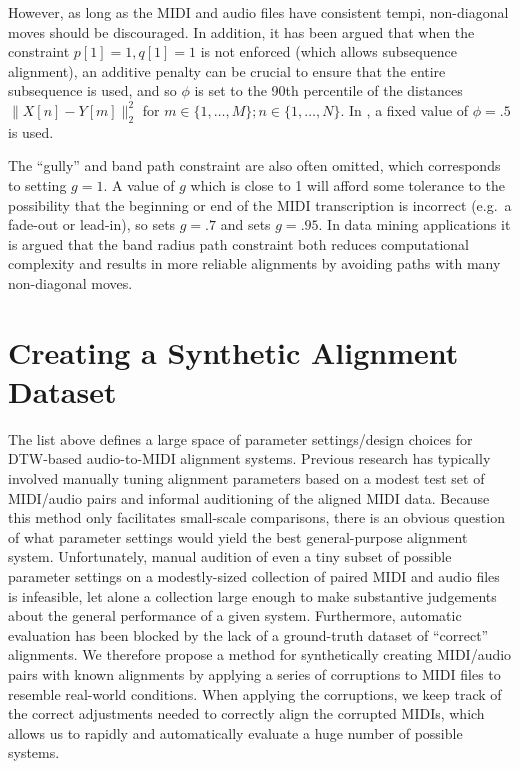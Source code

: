 \documentclass{article}
\begin{document}
\begin{description}[topsep=1pt,itemsep=-1pt,leftmargin=5pt]
However, as long as the MIDI and audio files have consistent tempi, non-diagonal moves should be discouraged.
In addition, it has been argued \cite{raffel2015large} that when the constraint $p[1] = 1, q[1] = 1$ is not enforced (which allows subsequence alignment), an additive penalty can be crucial to ensure that the entire subsequence is used, and so $\phi$ is set to the 90th percentile of the distances $\|X[n] - Y[m]\|_2^2$ for $m \in \{1, \ldots, M\}; n \in \{1, \ldots, N\}$.
In \cite{ellis2013aligning}, a fixed value of $\phi = .5$ is used.
\item[Gully ($g$) and band path constraint:] The ``gully'' and band path constraint are also often omitted, which corresponds to setting $g = 1$.
A value of $g$ which is close to 1 will afford some tolerance to the possibility that the beginning or end of the MIDI transcription is incorrect (e.g.\ a fade-out or lead-in), so \cite{ellis2013aligning} sets $g = .7$ and \cite{raffel2015large} sets $g = .95$.
In data mining applications \cite{ratanamahatana2004everything} it is argued that the band radius path constraint both reduces computational complexity and results in more reliable alignments by avoiding paths with many non-diagonal moves.
\end{description}

\section{Creating a Synthetic Alignment Dataset}
\label{sec:synthetic}

The list above defines a large space of parameter settings/design choices for DTW-based audio-to-MIDI alignment systems.
Previous research has typically involved manually tuning alignment parameters based on a modest test set of MIDI/audio pairs and informal auditioning of the aligned MIDI data.
Because this method only facilitates small-scale comparisons, there is an obvious question of what parameter settings would yield the best general-purpose alignment system.
Unfortunately, manual audition of even a tiny subset of possible parameter settings on a modestly-sized collection of paired MIDI and audio files is infeasible, let alone a collection large enough to make substantive judgements about the general performance of a given system.
Furthermore, automatic evaluation has been blocked by the lack of a ground-truth dataset of ``correct'' alignments.
We therefore propose a method for synthetically creating MIDI/audio pairs with known alignments by applying a series of corruptions to MIDI files to resemble real-world conditions.
When applying the corruptions, we keep track of the correct adjustments needed to correctly align the corrupted MIDIs, which allows us to rapidly and automatically evaluate a huge number of possible systems.
\end{document}
